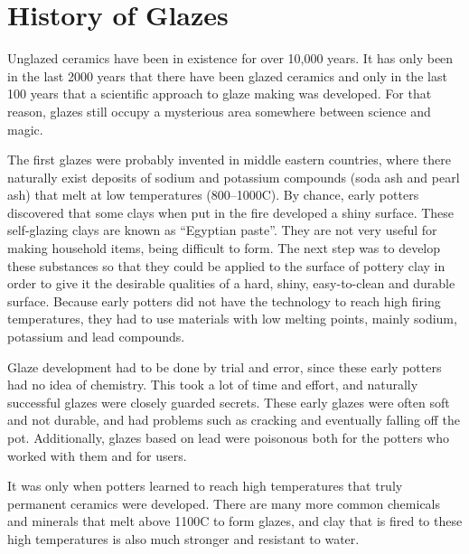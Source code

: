 \section{History of Glazes}
Unglazed ceramics have been in existence for over 10,000 years. It has only 
been in the last 2000 years that there have been glazed ceramics and only in 
the last 100 years that a scientific approach to glaze making was developed. 
For that reason, glazes still occupy a mysterious area somewhere between 
science and magic.

The first glazes were probably invented in middle eastern countries, where 
there naturally exist deposits of sodium and potassium compounds (soda ash and 
pearl ash) that melt at low temperatures (800\degree --1000\degree C). By 
chance, early potters discovered that some clays when put in the fire developed 
a shiny surface. These self-glazing clays are known as ``Egyptian paste''. They 
are not very useful for making household items, being difficult to form.
The next step was to develop these substances so that they could be applied to 
the surface of pottery clay in order to give it the desirable qualities of a 
hard, shiny, easy-to-clean and durable surface. Because early potters did not 
have the technology to reach high firing temperatures, they had to use 
materials with low melting points, mainly sodium, potassium and lead compounds. 

Glaze development had to be done by trial and error, since these early potters 
had no idea of chemistry. This took a lot of time and effort, and naturally 
successful glazes were closely guarded secrets. These early glazes were often 
soft and not durable, and had problems such as cracking and eventually falling 
off the pot. Additionally, glazes based on lead were poisonous both for the 
potters who worked with them and for users.

It was only when potters learned to reach high temperatures that truly 
permanent ceramics were developed. There are many more common chemicals and 
minerals that melt above 1100\degree C to form glazes, and clay that is fired 
to these high temperatures is also much stronger and resistant to water.
